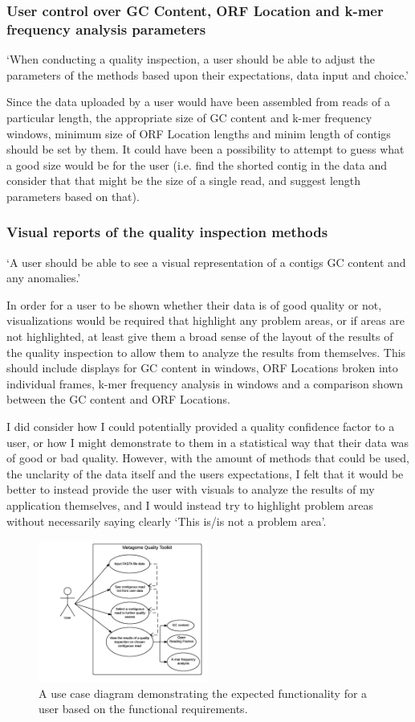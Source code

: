 \subsubsection{User control over GC Content, ORF Location and k-mer frequency analysis parameters}
`When conducting a quality inspection, a user should be able to adjust the parameters of the methods based upon their expectations, data input and choice.'

Since the data uploaded by a user would have been assembled from reads of a particular length, the appropriate size of GC content and k-mer frequency windows, minimum size of ORF Location lengths and minim length of contigs should be set by them. It could have been a possibility to attempt to guess what a good size would be for the user (i.e. find the shorted contig in the data and consider that that might be the size of a single read, and suggest length parameters based on that).

\subsubsection{Visual reports of the quality inspection methods}
`A user should be able to see a visual representation of a contigs GC content and any anomalies.'

In order for a user to be shown whether their data is of good quality or not, visualizations would be required that highlight any problem areas, or if areas are not highlighted, at least give them a broad sense of the layout of the results of the quality inspection to allow them to analyze the results from themselves. This should include displays for GC content in windows, ORF Locations broken into individual frames, k-mer frequency analysis in windows and a comparison shown between the GC content and ORF Locations.

I did consider how I could potentially provided a quality confidence factor to a user, or how I might demonstrate to them in a statistical way that their data was of good or bad quality. However, with the amount of methods that could be used, the unclarity of the data itself and the users expectations, I felt that it would be better to instead provide the user with visuals to analyze the results of my application themselves, and I would instead try to highlight problem areas without necessarily saying clearly `This is/is not a problem area'.

\begin{figure}[H]
 \centering
\caption{A use case diagram demonstrating the expected functionality for a user based on the functional requirements.}
\includegraphics[width=0.5\textwidth]{images/usecase}
\end{figure}

